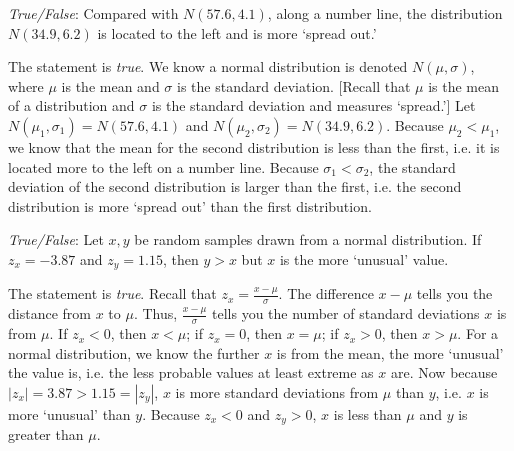 \documentclass[11pt,letterpaper]{article}
\begin{document}
\quizsol \textit{True/False}: Compared with $N(57.6, 4.1)$, along a number line, the distribution $N(34.9, 6.2)$ is located to the left and is more `spread out.' \pspace

\sol The statement is \textit{true}. We know a normal distribution is denoted $N(\mu, \sigma)$, where $\mu$ is the mean and $\sigma$ is the standard deviation. [Recall that $\mu$ is the mean of a distribution and $\sigma$ is the standard deviation and measures `spread.'] Let $N(\mu_1, \sigma_1)= N(57.6, 4.1)$ and $N(\mu_2, \sigma_2)= N(34.9, 6.2)$. Because $\mu_2 < \mu_1$, we know that the mean for the second distribution is less than the first, i.e. it is located more to the left on a number line. Because $\sigma_1 < \sigma_2$, the standard deviation of the second distribution is larger than the first, i.e. the second distribution is more `spread out' than the first distribution. \pvspace{1.3cm}



\quizsol \textit{True/False}: Let $x, y$ be random samples drawn from a normal distribution. If $z_x= -3.87$ and $z_y= 1.15$, then $y > x$ but $x$ is the more `unusual' value. \pspace

\sol The statement is \textit{true}. Recall that $z_x= \frac{x - \mu}{\sigma}$. The difference $x - \mu$ tells you the distance from $x$ to $\mu$. Thus, $\frac{x - \mu}{\sigma}$ tells you the number of standard deviations $x$ is from $\mu$. If $z_x < 0$, then $x < \mu$; if $z_x= 0$, then $x= \mu$; if $z_x > 0$, then $x > \mu$. For a normal distribution, we know the further $x$ is from the mean, the more `unusual' the value is, i.e. the less probable values at least extreme as $x$ are. Now because $|z_x|= 3.87 > 1.15= |z_y|$, $x$ is more standard deviations from $\mu$ than $y$, i.e. $x$ is more `unusual' than $y$. Because $z_x < 0$ and $z_y> 0$, $x$ is less than $\mu$ and $y$ is greater than $\mu$. \pvspace{1.3cm}





\end{document}
